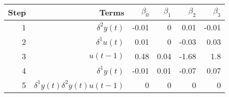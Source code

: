 \begin{tabular}{rrrrrr}
Step & Terms & $\beta_{0}$ & $\beta_{1}$ & $\beta_{2}$ & $\beta_{3}$ \\ 
\hline 
1 & $\delta^2 y(t)$ & -0.01 & 0 & 0.01 & -0.01 \\ 
2 & $\delta^1 u(t)$ & 0.01 & 0 & -0.03 & 0.03 \\ 
3 & $u(t-1)$ & 0.48 & 0.04 & -1.68 & 1.8 \\ 
4 & $\delta^1 y(t)$ & -0.01 & 0.01 & -0.07 & 0.07 \\ 
5 & $\delta^1 y(t)\delta^2 y(t)u(t-1)$ & 0 & 0 & 0 & 0 \\ 
\hline 
\end{tabular}